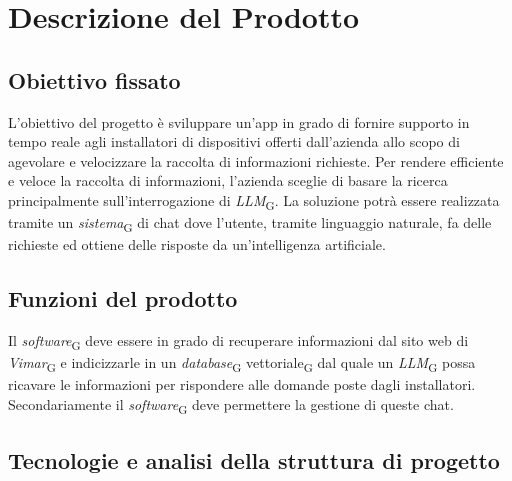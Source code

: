 \section{Descrizione del Prodotto}
\subsection{Obiettivo fissato}
L’obiettivo del progetto è sviluppare un’app in grado di fornire supporto in tempo reale agli installatori di dispositivi offerti dall’azienda allo scopo di agevolare e velocizzare la raccolta di informazioni richieste. Per rendere efficiente e veloce la raccolta di informazioni, l’azienda sceglie di basare la ricerca principalmente sull’interrogazione di \textit{LLM}\textsubscript{G}. La soluzione potrà essere realizzata tramite un \textit{sistema}\textsubscript{G} di chat dove l’utente, tramite linguaggio naturale, fa delle richieste ed ottiene delle risposte da un’intelligenza artificiale.

\subsection{Funzioni del prodotto}
Il \textit{software}\textsubscript{G} deve essere in grado di recuperare informazioni dal sito web di \textit{Vimar}\textsubscript{G} e indicizzarle in un \textit{database}\textsubscript{G} vettoriale\textsubscript{G} dal quale un \textit{LLM}\textsubscript{G} possa ricavare le informazioni per rispondere alle domande poste dagli installatori.
Secondariamente il \textit{software}\textsubscript{G} deve permettere la gestione di queste chat.

\subsection{Tecnologie  e analisi della struttura di progetto} 
